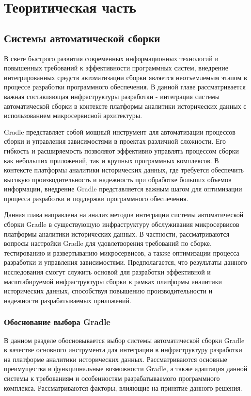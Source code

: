 \chapter{Теоритическая часть}\label{ch:-}


\section{Системы автоматической сборки}

В свете быстрого развития современных информационных технологий и повышенных требований к
эффективности программных систем, внедрение интегрированных средств автоматизации сборки является
неотъемлемым этапом в процессе разработки программного обеспечения.
В данной главе рассматривается
важная составляющая инфраструктуры разработки - интеграция системы автоматической сборки в
контексте платформы аналитики исторических данных с использованием микросервисной архитектуры.

Gradle представляет собой мощный инструмент для автоматизации процессов сборки и управления
зависимостями в проектах различной сложности.
Его гибкость и расширяемость позволяют эффективно
управлять процессом сборки как небольших приложений, так и крупных программных комплексов.
В
контексте платформы аналитики исторических данных, где требуется обеспечить высокую
производительность и надежность при обработке больших объемов информации, внедрение Gradle
представляется важным шагом для оптимизации процесса разработки и поддержки программного
обеспечения.

Данная глава направлена на анализ методов интеграции системы автоматической сборки Gradle
в существующую инфраструктуру обслуживания микросервисов платформы аналитики исторических данных.
В
частности, рассматриваются вопросы настройки Gradle для удовлетворения требований по сборке,
тестированию и развертыванию микросервисов, а также оптимизации процесса разработки и управления
зависимостями.
Предполагается, что результаты данного исследования смогут служить основой для
разработки эффективной и масштабируемой инфраструктуры сборки в рамках платформы аналитики
исторических данных, способствуя повышению производительности и надежности разрабатываемых
приложений.

\subsection{Обоснование выбора Gradle}

В данном разделе обосновывается выбор системы автоматической сборки Gradle в качестве основного инструмента для интеграции в инфраструктуру разработки на платформе аналитики исторических данных.
Рассматриваются основные преимущества и функциональные возможности Gradle, а также адаптация данной системы к требованиям и особенностям разрабатываемого программного комплекса.
Рассматриваются факторы, влияющие на принятие данного решения.

